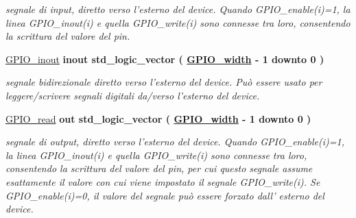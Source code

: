 \begin{DoxyCompactItemize}
\begin{DoxyCompactList}\small\item\em segnale di input, diretto verso l'esterno del device. Quando G\+P\+I\+O\+\_\+enable(i)=1, la linea G\+P\+I\+O\+\_\+inout(i) e quella G\+P\+I\+O\+\_\+write(i) sono connesse tra loro, consentendo la scrittura del valore del pin. \end{DoxyCompactList}\item 
\hypertarget{class_g_p_i_oarray_ga8829699d739ef35a4c5da396ffd38387}{\hyperlink{group___g_p_i_o-array_ga8829699d739ef35a4c5da396ffd38387}{G\+P\+I\+O\+\_\+inout}  {\bfseries {\bfseries \textcolor{vhdlchar}{inout}\textcolor{vhdlchar}{ }}} {\bfseries \textcolor{vhdlchar}{std\+\_\+logic\+\_\+vector}\textcolor{vhdlchar}{ }\textcolor{vhdlchar}{(}\textcolor{vhdlchar}{ }\textcolor{vhdlchar}{ }\textcolor{vhdlchar}{ }\textcolor{vhdlchar}{ }{\bfseries \hyperlink{group___g_p_i_o-array_ga0b52ca75e9a6093b2b60d5e851803069}{G\+P\+I\+O\+\_\+width}} \textcolor{vhdlchar}{-\/}\textcolor{vhdlchar}{ } \textcolor{vhdldigit}{1} \textcolor{vhdlchar}{ }\textcolor{vhdlchar}{downto}\textcolor{vhdlchar}{ }\textcolor{vhdlchar}{ } \textcolor{vhdldigit}{0} \textcolor{vhdlchar}{ }\textcolor{vhdlchar}{)}\textcolor{vhdlchar}{ }} }\label{class_g_p_i_oarray_ga8829699d739ef35a4c5da396ffd38387}

\begin{DoxyCompactList}\small\item\em segnale bidirezionale diretto verso l'esterno del device. Può essere usato per leggere/scrivere segnali digitali da/verso l'esterno del device. \end{DoxyCompactList}\item 
\hypertarget{class_g_p_i_oarray_gafbe6792efd02cef42af7717592c1b04a}{\hyperlink{group___g_p_i_o-array_gafbe6792efd02cef42af7717592c1b04a}{G\+P\+I\+O\+\_\+read}  {\bfseries {\bfseries \textcolor{vhdlchar}{out}\textcolor{vhdlchar}{ }}} {\bfseries \textcolor{vhdlchar}{std\+\_\+logic\+\_\+vector}\textcolor{vhdlchar}{ }\textcolor{vhdlchar}{(}\textcolor{vhdlchar}{ }\textcolor{vhdlchar}{ }\textcolor{vhdlchar}{ }\textcolor{vhdlchar}{ }{\bfseries \hyperlink{group___g_p_i_o-array_ga0b52ca75e9a6093b2b60d5e851803069}{G\+P\+I\+O\+\_\+width}} \textcolor{vhdlchar}{-\/}\textcolor{vhdlchar}{ } \textcolor{vhdldigit}{1} \textcolor{vhdlchar}{ }\textcolor{vhdlchar}{downto}\textcolor{vhdlchar}{ }\textcolor{vhdlchar}{ } \textcolor{vhdldigit}{0} \textcolor{vhdlchar}{ }\textcolor{vhdlchar}{)}\textcolor{vhdlchar}{ }} }\label{class_g_p_i_oarray_gafbe6792efd02cef42af7717592c1b04a}

\begin{DoxyCompactList}\small\item\em segnale di output, diretto verso l'esterno del device. Quando G\+P\+I\+O\+\_\+enable(i)=1, la linea G\+P\+I\+O\+\_\+inout(i) e quella G\+P\+I\+O\+\_\+write(i) sono connesse tra loro, consentendo la scrittura del valore del pin, per cui questo segnale assume esattamente il valore con cui viene impostato il segnale G\+P\+I\+O\+\_\+write(i). Se G\+P\+I\+O\+\_\+enable(i)=0, il valore del segnale può essere forzato dall' esterno del device. \end{DoxyCompactList}\end{DoxyCompactItemize}


